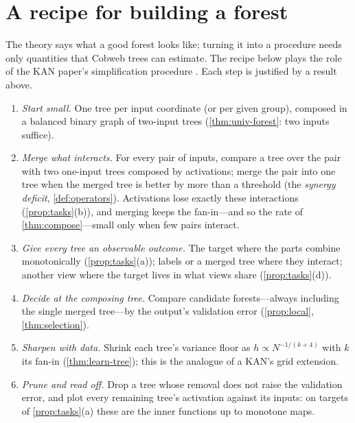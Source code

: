 \section{A recipe for building a forest}\label{sec:recipe}

The theory says what a good forest looks like; turning it into a procedure needs only
quantities that Cobweb trees can estimate.  The recipe below plays the role of the KAN
paper's simplification procedure \citep{liu2024kan}.  Each step is justified by a result
above.

\begin{procedure}\label{proc:recipe}
\leavevmode
\begin{enumerate}[leftmargin=*]
\item \emph{Start small.}  One tree per input coordinate (or per given group), composed in
  a balanced binary graph of two-input trees (\cref{thm:univ-forest}: two inputs suffice).
\item \emph{Merge what interacts.}  For every pair of inputs, compare a tree over the pair
  with two one-input trees composed by activations; merge the pair into one tree when the
  merged tree is better by more than a threshold (the \emph{synergy deficit},
  \cref{def:operators}).  Activations lose exactly these interactions
  (\cref{prop:tasks}(b)), and merging keeps the fan-in---and so the rate of
  \cref{thm:compose}---small only when few pairs interact.
\item \emph{Give every tree an observable outcome.}  The target where the parts combine
  monotonically (\cref{prop:tasks}(a)); labels or a merged tree where they interact; another
  view where the target lives in what views share (\cref{prop:tasks}(d)).
\item \emph{Decide at the composing tree.}  Compare candidate forests---always including
  the single merged tree---by the output's validation error (\cref{prop:local},
  \cref{thm:selection}).
\item \emph{Sharpen with data.}  Shrink each tree's variance floor as
  $h\propto N^{-1/(k+4)}$ with $k$ its fan-in (\cref{thm:learn-tree}); this is the analogue of
  a KAN's grid extension.
\item \emph{Prune and read off.}  Drop a tree whose removal does not raise the validation
  error, and plot every remaining tree's activation against its inputs: on targets of
  \cref{prop:tasks}(a) these are the inner functions up to monotone maps.
\end{enumerate}
\end{procedure}

